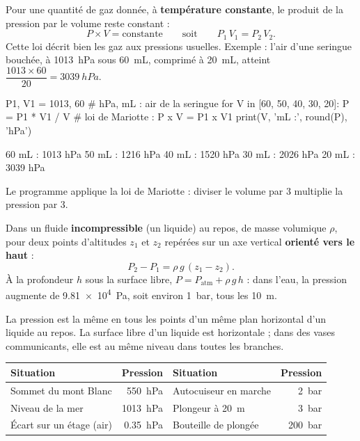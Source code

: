 \par{}
\begin{loi}
Pour une quantité de gaz donnée, à \textbf{température constante}, le produit de la pression par le volume reste constant :
\[P\times V=\text{constante}\qquad\text{soit}\qquad P_1\,V_1=P_2\,V_2.\]
Cette loi décrit bien les gaz aux pressions usuelles. Exemple : l'air d'une seringue bouchée, à \qty{1013}{hPa} sous \qty{60}{mL},
comprimé à \qty{20}{mL}, atteint $\dfrac{1013\times60}{20}=\qty{3039}{hPa}$.
\end{loi}
\par{}
\begin{python}
P1, V1 = 1013, 60          # hPa, mL : air de la seringue
for V in [60, 50, 40, 30, 20]:
    P = P1 * V1 / V        # loi de Mariotte : P x V = P1 x V1
    print(V, 'mL :', round(P), 'hPa')
\end{python}
\begin{console}
60 mL : 1013 hPa
50 mL : 1216 hPa
40 mL : 1520 hPa
30 mL : 2026 hPa
20 mL : 3039 hPa
\end{console}
\noindent{} Le programme applique la loi de Mariotte : diviser le volume par 3 multiplie la pression par 3.
\begin{loi}
Dans un fluide \textbf{incompressible} (un liquide) au repos, de masse volumique $\rho$, pour deux points d'altitudes $z_1$ et $z_2$
repérées sur un axe vertical \textbf{orienté vers le haut} :
\[P_2-P_1=\rho\,g\,(z_1-z_2).\]
À la profondeur $h$ sous la surface libre, $P=P_\mathrm{atm}+\rho\,g\,h$ : dans l'eau, la pression augmente de \qty{9,81e4}{Pa}, soit
environ \qty{1}{bar}, tous les \qty{10}{m}.
\end{loi}
\begin{propriete}[Conséquences]
La pression est la même en tous les points d'un même plan horizontal d'un liquide au repos. La surface libre d'un liquide
est horizontale ; dans des vases communicants, elle est au même niveau dans toutes les branches.
\end{propriete}
\par{}
\begin{propriete}
\par\smallskip\noindent\hfill\begin{tabular}{lr@{\qquad}lr}
\toprule
Situation & Pression & Situation & Pression \\
\midrule
Sommet du mont Blanc & \qty{550}{hPa} & Autocuiseur en marche & \qty{2}{bar} \\
Niveau de la mer & \qty{1013}{hPa} & Plongeur à \qty{20}{m} & \qty{3}{bar} \\
Écart sur un étage (air) & \qty{0,35}{hPa} & Bouteille de plongée & \qty{200}{bar} \\
\bottomrule
\end{tabular}\hfill\null\par\smallskip
\end{propriete}
